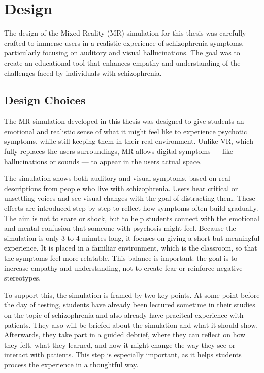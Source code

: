 \chapter{Design}
\label{ch:design}

The design of the Mixed Reality (MR) simulation for this thesis was carefully crafted to immerse users in a realistic experience of schizophrenia symptoms, particularly focusing on auditory and visual hallucinations. The goal was to create an educational tool that enhances empathy and understanding of the challenges faced by individuals with schizophrenia.

\section{Design Choices}

The MR simulation developed in this thesis was designed to give students an emotional and realistic sense of what it might feel like to experience psychotic symptoms, while still keeping them in their real environment. Unlike VR, which fully replaces the users surroundings, MR allows digital symptoms — like hallucinations or sounds — to appear in the users actual space. %

The simulation shows both auditory and visual symptoms, based on real descriptions from people who live with schizophrenia. Users hear critical or unsettling voices and see visual changes with the goal of distracting them. These effects are introduced step by step to reflect how symptoms often build gradually. The aim is not to scare or shock, but to help students connect with the emotional and mental confusion that someone with psychosis might feel. Because the simulation is only 3 to 4 minutes long, it focuses on giving a short but meaningful experience. It is placed in a familiar environment, which is the classroom, so that the symptoms feel more relatable. This balance is important: the goal is to increase empathy and understanding, not to create fear or reinforce negative stereotypes. %

\vspace{1em}

To support this, the simulation is framed by two key points. At some point before the day of testing, students have already been lectured sometime in their studies on the topic of schizophrenia and also already have pracitcal experience with patients. They also will be briefed about the simulation and what it should show. Afterwards, they take part in a guided debrief, where they can reflect on how they felt, what they learned, and how it might change the way they see or interact with patients. This step is especially important, as it helps students process the experience in a thoughtful way.

